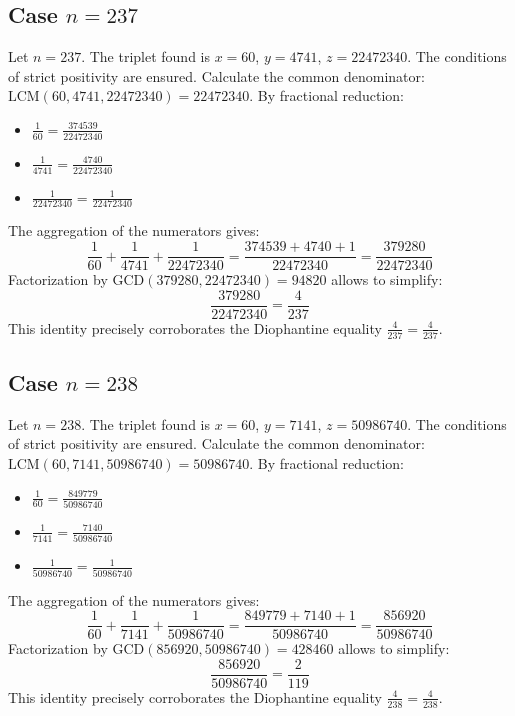 \documentclass[11pt,a4paper]{article}
\begin{document}
\subsection{Case $n = 237$}
Let $n = 237$. The triplet found is $x = 60$, $y = 4741$, $z = 22472340$.
The conditions of strict positivity are ensured.
Calculate the common denominator: $\text{LCM}(60, 4741, 22472340) = 22472340$.
By fractional reduction:
\begin{itemize}
    \item $\frac{1}{60} = \frac{374539}{22472340}$
    \item $\frac{1}{4741} = \frac{4740}{22472340}$
    \item $\frac{1}{22472340} = \frac{1}{22472340}$
\end{itemize}
The aggregation of the numerators gives:
$$ \frac{1}{60} + \frac{1}{4741} + \frac{1}{22472340} = \frac{374539 + 4740 + 1}{22472340} = \frac{379280}{22472340} $$
Factorization by $\text{GCD}(379280, 22472340) = 94820$ allows to simplify:
$$ \frac{379280}{22472340} = \frac{4}{237} $$
This identity precisely corroborates the Diophantine equality $\frac{4}{237} = \frac{4}{237}$.

\subsection{Case $n = 238$}
Let $n = 238$. The triplet found is $x = 60$, $y = 7141$, $z = 50986740$.
The conditions of strict positivity are ensured.
Calculate the common denominator: $\text{LCM}(60, 7141, 50986740) = 50986740$.
By fractional reduction:
\begin{itemize}
    \item $\frac{1}{60} = \frac{849779}{50986740}$
    \item $\frac{1}{7141} = \frac{7140}{50986740}$
    \item $\frac{1}{50986740} = \frac{1}{50986740}$
\end{itemize}
The aggregation of the numerators gives:
$$ \frac{1}{60} + \frac{1}{7141} + \frac{1}{50986740} = \frac{849779 + 7140 + 1}{50986740} = \frac{856920}{50986740} $$
Factorization by $\text{GCD}(856920, 50986740) = 428460$ allows to simplify:
$$ \frac{856920}{50986740} = \frac{2}{119} $$
This identity precisely corroborates the Diophantine equality $\frac{4}{238} = \frac{4}{238}$.
\end{document}
